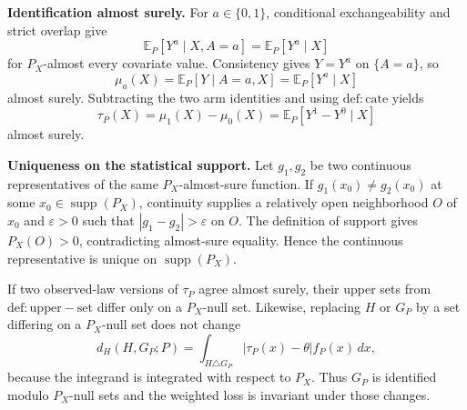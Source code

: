 \textbf{Identification almost surely.} For \(a\in\{0,1\}\), conditional exchangeability and strict overlap give
\[
\mathbb E_P[Y^a\mid X,A=a]=\mathbb E_P[Y^a\mid X]
\]
for \(P_X\)-almost every covariate value. Consistency gives \(Y=Y^a\) on \(\{A=a\}\), so
\[
\mu_a(X)=\mathbb E_P[Y\mid A=a,X]=\mathbb E_P[Y^a\mid X]
\]
almost surely. Subtracting the two arm identities and using \(\mathrm{def:cate}\) yields
\[
\tau_P(X)=\mu_1(X)-\mu_0(X)=\mathbb E_P[Y^1-Y^0\mid X]
\]
almost surely.

\textbf{Uniqueness on the statistical support.} Let \(g_1,g_2\) be two continuous representatives of the same \(P_X\)-almost-sure function. If \(g_1(x_0)\ne g_2(x_0)\) at some \(x_0\in\operatorname{supp}(P_X)\), continuity supplies a relatively open neighborhood \(O\) of \(x_0\) and \(\varepsilon>0\) such that \(|g_1-g_2|>\varepsilon\) on \(O\). The definition of support gives \(P_X(O)>0\), contradicting almost-sure equality. Hence the continuous representative is unique on \(\operatorname{supp}(P_X)\).

If two observed-law versions of \(\tau_P\) agree almost surely, their upper sets from \(\mathrm{def:upper-set}\) differ only on a \(P_X\)-null set. Likewise, replacing \(H\) or \(G_P\) by a set differing on a \(P_X\)-null set does not change
\[
d_H(H,G_P;P)=\int_{H\triangle G_P}|\tau_P(x)-\theta|f_P(x)\,dx,
\]
because the integrand is integrated with respect to \(P_X\). Thus \(G_P\) is identified modulo \(P_X\)-null sets and the weighted loss is invariant under those changes.